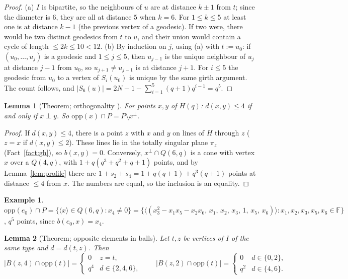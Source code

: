 \documentclass[11pt]{amsart}
\theoremstyle{plain}
\newtheorem{lemma}{Lemma}[section]
\theoremstyle{definition}
\newtheorem*{example}{Example}
\theoremstyle{remark}
\newcommand{\F}{\mathbb{F}}
\newcommand{\opp}{\mathrm{opp}}
\newcommand{\ip}{\perp}
\newcommand{\pP}{P}  %
\begin{document}
\begin{proof}
(a) $I$ is bipartite, so the neighbours of $u$ are at distance $k \pm 1$ from $t$; since the diameter is $6$, they are all
at distance $5$ when $k = 6$. For $1 \le k \le 5$ at least one is at distance $k-1$ (the previous vertex of a geodesic).
If two were, there would be two distinct geodesics from $t$ to $u$, and their union would contain a cycle of length
$\le 2k \le 10 < 12$.
(b) By induction on $j$, using (a) with $t := u_0$: if $(u_0, \dots, u_j)$ is a geodesic and $1 \le j \le 5$, then
$u_{j-1}$ is the unique neighbour of $u_j$ at distance $j-1$ from $u_0$, so $u_{j+1} \ne u_{j-1}$ is at distance $j+1$.
For $i \le 5$ the geodesic from $u_0$ to a vertex of $S_i(u_0)$ is unique by the same girth argument. The count follows,
and $|S_6(u)| = 2N - 1 - \sum_{i=1}^5 (q+1)q^{i-1} = q^5$.
\end{proof}

\begin{lemma}[Theorem; orthogonality {\cite[\S2.4]{VM98}}]\label{lem:perp}
For points $x, y$ of $H(q)$: $d(x,y) \le 4$ if and only if $x \ip y$. So $\opp(x) \cap \pP = \pP \setminus x^\perp$.
\end{lemma}

\begin{proof}
If $d(x,y) \le 4$, there is a point $z$ with $x$ and $y$ on lines of $H$ through $z$ ($z = x$ if $d(x,y) \le 2$). These
lines lie in the totally singular plane $\pi_z$ (Fact~\ref{fact:gh}), so $b(x,y) = 0$. Conversely, $x^\perp \cap Q(6,q)$ is
a cone with vertex $x$ over a $Q(4,q)$, with $1 + q(q^3+q^2+q+1)$ points, and by Lemma~\ref{lem:profile} there are
$1 + s_2 + s_4 = 1 + q(q+1) + q^3(q+1)$ points at distance $\le 4$ from $x$. The numbers are equal, so the inclusion is
an equality.
\end{proof}

\begin{example}\label{ex:opp}
$\opp(e_0) \cap \pP = \{\langle x \rangle \in Q(6,q) : x_4 \ne 0\} = \{\langle (x_3^2 - x_1x_5 - x_2x_6,\, x_1,\, x_2,\,
x_3,\, 1,\, x_5,\, x_6)\rangle : x_1, x_2, x_3, x_5, x_6 \in \F\}$, $q^5$ points, since $b(e_0, x) = x_4$.
\end{example}

\begin{lemma}[Theorem; opposite elements in balls]\label{lem:balls}
Let $t, z$ be vertices of $I$ of the same type and $d = d(t,z)$. Then
\[
|B(z,4) \cap \opp(t)| = \begin{cases} 0 & z = t,\\ q^4 & d \in \{2,4,6\},\end{cases}\qquad
|B(z,2) \cap \opp(t)| = \begin{cases} 0 & d \in \{0,2\},\\ q^2 & d \in \{4,6\}.\end{cases}
\]
\end{lemma}
\end{document}
